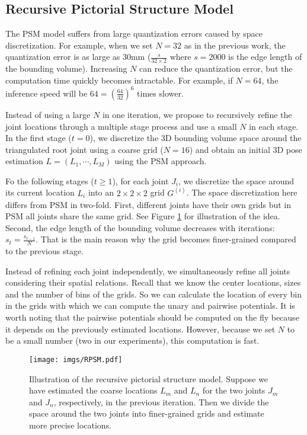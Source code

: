 \documentclass[10pt,twocolumn,letterpaper]{article}
\begin{document}
\subsection{Recursive Pictorial Structure Model}
The PSM model suffers from large quantization errors caused by space discretization. For example, when we set $N=32$ as in the previous work, the quantization error is as large as $30$mm (\ie $\frac{s}{32 \times 2}$ where $s=2000$ is the edge length of the bounding volume). Increasing $N$ can reduce the quantization error, but the computation time quickly becomes intractable. For example, if $N=64$, the inference speed will be $64=(\frac{64}{32})^6$ times slower.




Instead of using a large $N$ in one iteration, we propose to recursively refine the joint locations through a multiple stage process and use a small $N$ in each stage. In the first stage ($t=0$), we discretize the $3$D bounding volume space around the triangulated root joint using a coarse grid ($N=16$) and obtain an initial $3$D pose estimation $L=(L_1,\cdots,L_M)$ using the PSM approach.


Fo the following stages ($t \ge 1$), for each joint $J_i$, we discretize the space around its current location $L_i$ into an $2 \times 2 \times 2$ grid $G^{(i)}$. The space discretization here differs from PSM in two-fold. First, different joints have their own grids but in PSM all joints share the same grid. See Figure \ref{fig:recursive} for illustration of the idea. Second, the edge length of the bounding volume decreases with iterations: $s_{t}=\frac{s_{t-1}}{N}$. That is the main reason why the grid becomes finer-grained compared to the previous stage.




Instead of refining each joint independently, we simultaneously refine all joints considering their spatial relations. Recall that we know the center locations, sizes and the number of bins of the grids. So we can calculate the location of every bin in the grids with which we can compute the unary and pairwise potentials. It is worth noting that the pairwise potentials should be computed on the fly because it depends on the previously estimated locations. However, because we set $N$ to be a small number (two in our experiments), this computation is fast. 

\begin{figure}
	\centering
	\texttt{[image: imgs/RPSM.pdf]}
	\caption{Illustration of the recursive pictorial structure model. Suppose we have estimated the coarse locations $L_m$ and $L_n$ for the two joints $J_m$ and $J_n$, respectively, in the previous iteration. Then we divide the space around the two joints into finer-grained grids and estimate more precise locations.}
	\label{fig:recursive}
\end{figure}
\end{document}
